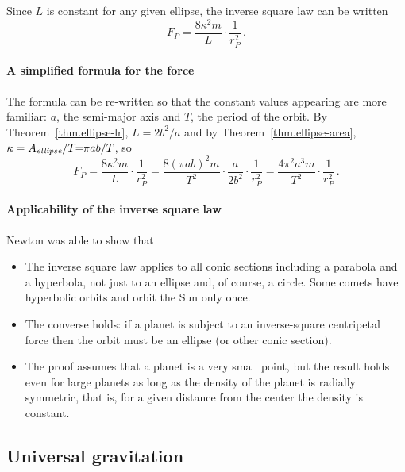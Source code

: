 Since $L$ is constant for any given ellipse, the inverse square law can be written
\[
F_P = \frac{8\kappa^2m}{L}\cdot\frac{1}{r_P^2}\,.\label{eqn.inverse}
\]

\paragraph{A simplified formula for the force}

The formula can be re-written so that the constant values appearing are more familiar: $a$, the semi-major axis and $T$, the period of the orbit. By Theorem~\ref{thm.ellipse-lr}, $L\!\!=\!\!2b^2/a$ and by Theorem~\ref{thm.ellipse-area}, $\kappa = A_{\textit{\scriptsize ellipse}}/T\!\!=\!\!\pi ab/T$, so
\begin{equation}
F_P = \frac{8\kappa^2 m}{L}\cdot\frac{1}{r_P^2}
=\frac{8(\pi a b)^2 m}{T^2}\cdot \frac{a}{2b^2}\cdot\frac{1}{r_P^2}
=\frac{4\pi^2 a^3 m}{T^2}\cdot\frac{1}{r_P^2}\,.\label{eqn.planet-force}
\end{equation}

\paragraph{Applicability of the inverse square law}
Newton was able to show that
\begin{itemize}
\item The inverse square law applies to all conic sections including a parabola and a hyperbola, not just to an ellipse and, of course, a circle. Some comets have hyperbolic orbits and orbit the Sun only once.
\item The converse holds: if a planet is subject to an inverse-square centripetal force then the orbit must be an ellipse (or other conic section).
\item The proof assumes that a planet is a very small point, but the result holds even for large planets as long as the density of the planet is radially symmetric, that is, for a given distance from the center the density is constant.
\end{itemize}


\subsection{Universal gravitation}

